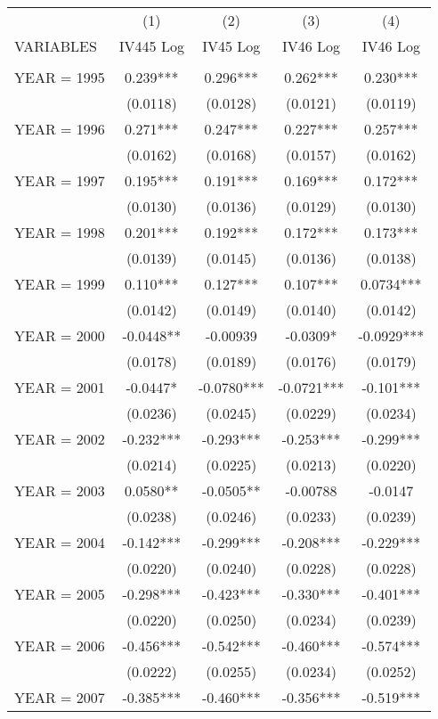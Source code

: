\begin{tabular}{lcccc} \hline
 & (1) & (2) & (3) & (4) \\
VARIABLES & IV445 Log & IV45 Log & IV46 Log & IV46 Log \\ \hline
 &  &  &  &  \\
YEAR = 1995 & 0.239*** & 0.296*** & 0.262*** & 0.230*** \\
 & (0.0118) & (0.0128) & (0.0121) & (0.0119) \\
YEAR = 1996 & 0.271*** & 0.247*** & 0.227*** & 0.257*** \\
 & (0.0162) & (0.0168) & (0.0157) & (0.0162) \\
YEAR = 1997 & 0.195*** & 0.191*** & 0.169*** & 0.172*** \\
 & (0.0130) & (0.0136) & (0.0129) & (0.0130) \\
YEAR = 1998 & 0.201*** & 0.192*** & 0.172*** & 0.173*** \\
 & (0.0139) & (0.0145) & (0.0136) & (0.0138) \\
YEAR = 1999 & 0.110*** & 0.127*** & 0.107*** & 0.0734*** \\
 & (0.0142) & (0.0149) & (0.0140) & (0.0142) \\
YEAR = 2000 & -0.0448** & -0.00939 & -0.0309* & -0.0929*** \\
 & (0.0178) & (0.0189) & (0.0176) & (0.0179) \\
YEAR = 2001 & -0.0447* & -0.0780*** & -0.0721*** & -0.101*** \\
 & (0.0236) & (0.0245) & (0.0229) & (0.0234) \\
YEAR = 2002 & -0.232*** & -0.293*** & -0.253*** & -0.299*** \\
 & (0.0214) & (0.0225) & (0.0213) & (0.0220) \\
YEAR = 2003 & 0.0580** & -0.0505** & -0.00788 & -0.0147 \\
 & (0.0238) & (0.0246) & (0.0233) & (0.0239) \\
YEAR = 2004 & -0.142*** & -0.299*** & -0.208*** & -0.229*** \\
 & (0.0220) & (0.0240) & (0.0228) & (0.0228) \\
YEAR = 2005 & -0.298*** & -0.423*** & -0.330*** & -0.401*** \\
 & (0.0220) & (0.0250) & (0.0234) & (0.0239) \\
YEAR = 2006 & -0.456*** & -0.542*** & -0.460*** & -0.574*** \\
 & (0.0222) & (0.0255) & (0.0234) & (0.0252) \\
YEAR = 2007 & -0.385*** & -0.460*** & -0.356*** & -0.519*** \\

\end{tabular}
